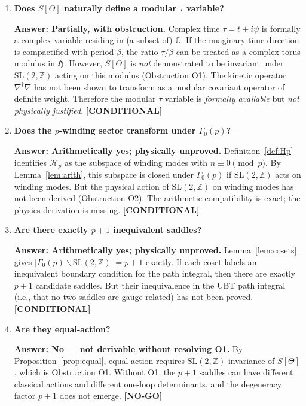 \documentclass[12pt,a4paper]{article}
\theoremstyle{definition}
\theoremstyle{remark}
\newcommand{\COND}  {\textcolor{blue!70!black} {\textbf{[CONDITIONAL]}}}
\newcommand{\NOGO}  {\textcolor{red!80!black}  {\textbf{[NO-GO]}}}
\newcommand{\SL}{\mathrm{SL}}
\newcommand{\bH}{\mathfrak{H}}     %
\newcommand{\CC}{\mathbb{C}}
\newcommand{\ZZ}{\mathbb{Z}}
\newcommand{\Gam}{\Gamma}
\newcommand{\Hp}{\mathcal{H}_p}
\begin{document}
\begin{enumerate}[label=Q\arabic*.]

\item \textbf{Does $S[\Theta]$ naturally define a modular $\tau$ variable?}

  \textbf{Answer: Partially, with obstruction.}
  Complex time $\tau=t+i\psi$ is formally a complex variable residing in
  (a subset of) $\CC$.  If the imaginary-time direction is compactified
  with period $\beta$, the ratio $\tau/\beta$ can be treated as a
  complex-torus modulus in $\bH$.  However, $S[\Theta]$ is
  \emph{not} demonstrated to be invariant under $\SL(2,\ZZ)$ acting on
  this modulus (Obstruction O1).  The kinetic operator $\nabla^\dagger\nabla$
  has not been shown to transform as a modular covariant operator of
  definite weight.  Therefore the modular $\tau$ variable is
  \emph{formally available} but \emph{not physically justified}.
  \hfill\COND

\item \textbf{Does the $p$-winding sector transform under $\Gam_0(p)$?}

  \textbf{Answer: Arithmetically yes; physically unproved.}
  Definition~\ref{def:Hp} identifies $\Hp$ as the subspace of winding
  modes with $n\equiv 0\pmod{p}$.  By Lemma~\ref{lem:arith}, this
  subspace is closed under $\Gam_0(p)$ if $\SL(2,\ZZ)$ acts on winding
  modes.  But the physical action of $\SL(2,\ZZ)$ on winding modes
  has not been derived (Obstruction O2).  The arithmetic compatibility
  is exact; the physics derivation is missing.
  \hfill\COND

\item \textbf{Are there exactly $p+1$ inequivalent saddles?}

  \textbf{Answer: Arithmetically yes; physically unproved.}
  Lemma~\ref{lem:cosets} gives $|\Gam_0(p)\backslash\SL(2,\ZZ)|=p+1$
  exactly.  If each coset labels an inequivalent boundary condition for
  the path integral, then there are exactly $p+1$ candidate saddles.
  But their inequivalence in the UBT path integral (i.e., that no two
  saddles are gauge-related) has not been proved.
  \hfill\COND

\item \textbf{Are they equal-action?}

  \textbf{Answer: No — not derivable without resolving O1.}
  By Proposition~\ref{prop:equal}, equal action requires $\SL(2,\ZZ)$
  invariance of $S[\Theta]$, which is Obstruction O1.  Without O1,
  the $p+1$ saddles can have different classical actions and different
  one-loop determinants, and the degeneracy factor $p+1$ does not emerge.
  \hfill\NOGO


\end{enumerate}
\end{document}
